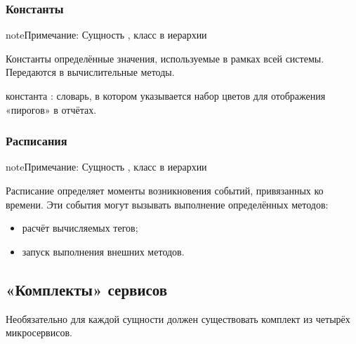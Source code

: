 \documentclass[a4paper,10pt,russian]{sphinxmanual}
\begin{document}
\subsubsection{Константы}
\label{\detokenize{architecture:id12}}
\begin{sphinxadmonition}{note}{Примечание:}
\sphinxAtStartPar
Сущность , класс в иерархии 
\end{sphinxadmonition}

\sphinxAtStartPar
Константы \sphinxhyphen{} определённые значения, используемые в рамках всей системы.
Передаются в вычислительные методы.



\sphinxAtStartPar
{} константа : словарь, в котором указывается набор
цветов для отображения «пирогов» в отчётах.




\subsubsection{Расписания}
\label{\detokenize{architecture:id13}}
\begin{sphinxadmonition}{note}{Примечание:}
\sphinxAtStartPar
Сущность , класс в иерархии 
\end{sphinxadmonition}

\sphinxAtStartPar
Расписание определяет моменты возникновения событий, привязанных ко времени.
Эти события могут вызывать выполнение определённых методов:
\begin{itemize}
\item {}
\sphinxAtStartPar
расчёт вычисляемых тегов;

\item {}
\sphinxAtStartPar
запуск выполнения внешних методов.

\end{itemize}


\subsection{«Комплекты» сервисов}
\label{\detokenize{architecture:id14}}
\sphinxAtStartPar
Необязательно для каждой сущности должен существовать комплект из четырёх
микросервисов.



\sphinxAtStartPar
{}
\end{document}
